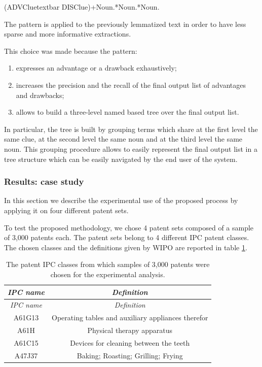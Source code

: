 \documentclass[]{book}
\providecommand{\tightlist}{%
  \setlength{\itemsep}{0pt}\setlength{\parskip}{0pt}}
\begin{document}
(ADVClue\textbar{}textbar DISClue)+Noun.*Noun.*Noun.

The pattern is applied to the previously lemmatized text in order to
have less sparse and more informative extractions.

This choice was made because the pattern:

\begin{enumerate}
\def\labelenumi{\arabic{enumi}.}
\tightlist
\item
  expresses an advantage or a drawback exhaustively;
\item
  increases the precision and the recall of the final output list of
  advantages and drawbacks;
\item
  allows to build a three-level named based tree over the final output
  list.
\end{enumerate}

In particular, the tree is built by grouping terms which share at the
first level the same clue, at the second level the same noun and at the
third level the same noun. This grouping procedure allows to easily
represent the final output list in a tree structure which can be easily
navigated by the end user of the system.

\subsubsection{Results: case study}\label{results-case-study}

In this section we describe the experimental use of the proposed process
by applying it on four different patent sets.

To test the proposed methodology, we chose 4 patent sets composed of a
sample of 3,000 patents each. The patent sets belong to 4 different IPC
patent classes. The chosen classes and the definitions given by WIPO are
reported in table \ref{tab:advdrwarticleexampleipcclasses}.

\begin{longtable}[]{@{}cc@{}}
\caption{\label{tab:advdrwarticleexampleipcclasses} The patent IPC classes
from which samples of 3,000 patents were chosen for the experimental
analysis.}\tabularnewline
\toprule
\emph{IPC name} & \emph{Definition}\tabularnewline
\midrule
\endfirsthead
\toprule
\emph{IPC name} & \emph{Definition}\tabularnewline
\midrule
\endhead
A61G13 & Operating tables and auxiliary appliances
therefor\tabularnewline
A61H & Physical therapy apparatus\tabularnewline
A61C15 & Devices for cleaning between the teeth\tabularnewline
A47J37 & Baking; Roasting; Grilling; Frying\tabularnewline
\bottomrule
\end{longtable}
\end{document}
